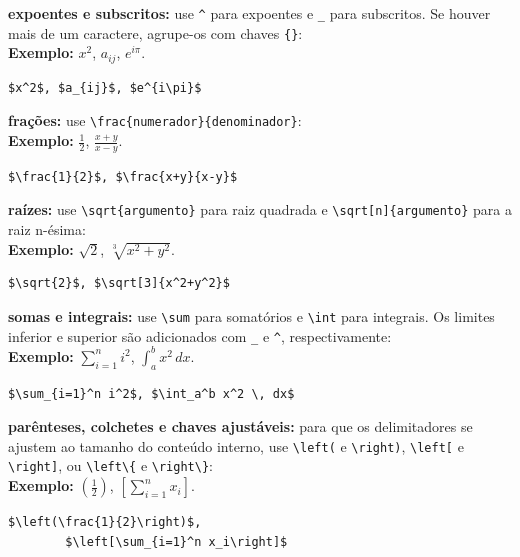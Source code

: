 \begin{alineas}
	\item \textbf{expoentes e subscritos:} use \verb|^| para expoentes e \verb|_| para subscritos. Se houver mais de um caractere, agrupe-os com chaves \verb|{}|:\\
	\textbf{Exemplo:} $x^2$, $a_{ij}$, $e^{i\pi}$.
	\begin{lstlisting}[language={[LaTeX]TeX}]
	$x^2$, $a_{ij}$, $e^{i\pi}$
	\end{lstlisting}
	
	
	\item \textbf{frações:} use \verb|\frac{numerador}{denominador}|:\\
	\textbf{Exemplo:} $\frac{1}{2}$, $\frac{x+y}{x-y}$.
	\begin{lstlisting}[language={[LaTeX]TeX}]
	$\frac{1}{2}$, $\frac{x+y}{x-y}$
	\end{lstlisting}
	
	\item \textbf{raízes:} use \verb|\sqrt{argumento}| para raiz quadrada e \verb|\sqrt[n]{argumento}| para a raiz n-ésima:\\
	\textbf{Exemplo:} $\sqrt{2}$, $\sqrt[3]{x^2+y^2}$.
	\begin{lstlisting}[language={[LaTeX]TeX}]
	$\sqrt{2}$, $\sqrt[3]{x^2+y^2}$
	\end{lstlisting}
	
	\item \textbf{somas e integrais:} use \verb|\sum| para somatórios e \verb|\int| para integrais. Os limites inferior e superior são adicionados com \verb|_| e \verb|^|, respectivamente:\\
	\textbf{Exemplo:} $\sum_{i=1}^n i^2$, $\int_a^b x^2 \, dx$.
	\begin{lstlisting}[language={[LaTeX]TeX}]
	$\sum_{i=1}^n i^2$, $\int_a^b x^2 \, dx$
	\end{lstlisting}
	
	\item \textbf{parênteses, colchetes e chaves ajustáveis:} para que os delimitadores se ajustem ao tamanho do conteúdo interno, use \verb|\left(| e \verb|\right)|, \verb|\left[| e \verb|\right]|, ou \verb|\left\{| e \verb|\right\}|:\\
	\textbf{Exemplo:} $\left(\frac{1}{2}\right)$, $\left[\sum_{i=1}^n x_i\right]$.
	\begin{lstlisting}[language={[LaTeX]TeX}]
	$\left(\frac{1}{2}\right)$,
		$\left[\sum_{i=1}^n x_i\right]$
	\end{lstlisting}
	

\end{alineas}
